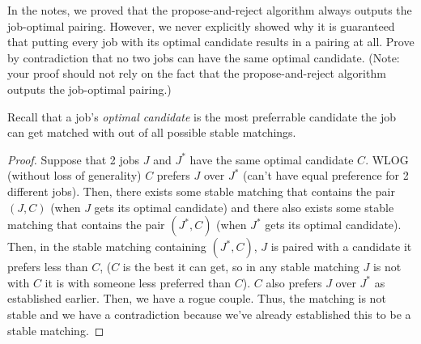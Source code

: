\documentclass[11pt]{article}
\begin{document}

In the notes, we proved that the propose-and-reject algorithm always outputs the job-optimal pairing.  However, we never explicitly showed why it is guaranteed that putting every job with its optimal candidate results in a pairing at all.  Prove by contradiction that no two jobs can have the same optimal candidate.  (Note: your proof should not rely on the fact that the propose-and-reject algorithm outputs the job-optimal pairing.)

\begin{solution}
Recall that a job's \textit{optimal candidate}
is the most preferrable candidate the job can get matched with
out of all possible stable matchings.
\begin{proof}
Suppose that 2 jobs $J$ and $J^*$ have the same optimal candidate $C$.
WLOG (without loss of generality) $C$ prefers $J$ over $J^*$ (can't have equal preference for 2 different jobs). 
Then, there exists some stable matching that contains the pair $(J,C)$ (when $J$ gets its optimal candidate)
and there also exists some stable matching that contains the pair $(J^*,C)$ (when $J^*$ gets its optimal candidate).
Then, in the stable matching containing $(J^*,C)$,
$J$ is paired with a candidate it prefers less than $C$, ($C$ is the best it can get, so in any stable matching $J$ is not with $C$ it is with someone less preferred than $C$).
$C$ also prefers $J$ over $J^*$ as established earlier.
Then, we have a rogue couple. Thus, the matching is not stable and 
we have a contradiction because we've already established this to be a stable matching.
\end{proof}
\end{solution}
\end{document}
